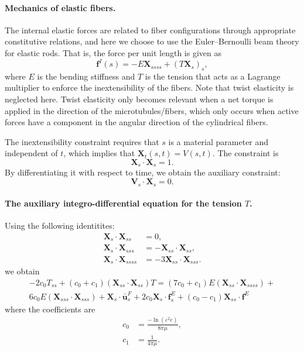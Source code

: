 \documentclass{article}
\newcommand{\XX}{\mathbf{X}}
\newcommand{\ubarF}{\bar{\mathbf{u}}^F}
\newcommand{\ff}{\mathbf{f}}
\newcommand{\VV}{\mathbf{V}}
\begin{document}
\paragraph{Mechanics of elastic fibers.}
The internal elastic forces are related to fiber configurations through appropriate constitutive relations, and here we choose to use the Euler–Bernoulli beam theory for elastic rods. That is, the force per unit length is given as
\begin{equation}
    \ff^I(s) = -E \XX_{ssss} + (T\XX_s)_s,
\end{equation}
where $E$ is the bending stiffness and $T$ is the tension that acts as a Lagrange multiplier to enforce the inextensibility of the fibers. Note that twist elasticity is neglected here. Twist elasticity only becomes relevant when a net torque is applied in the direction of the microtubules/fibers, which only occurs when active forces have a component in the angular direction of the cylindrical fibers.

The inextensibility constraint requires that $s$ is a material parameter and independent of $t$, which implies that $\XX_t(s,t) = V(s,t)$. The constraint is
\begin{equation}\label{eq:inextens}
    \XX_s \cdot \XX_s = 1.
\end{equation}
By differentiating it with respect to time, we obtain the auxiliary constraint:
\begin{equation}\label{eq:auxInextens}
    \VV_s \cdot \XX_s = 0.
\end{equation}
\paragraph*{The auxiliary integro-differential equation for the tension $T$.}
Using the following identitites:
\begin{align}
    \XX_s \cdot \XX_{ss} & = 0, \\
    \XX_s \cdot \XX_{sss} & = -\XX_{ss}\cdot \XX_{ss}, \\
    \XX_s \cdot \XX_{ssss} & = -3\XX_{ss} \cdot \XX_{sss}.
\end{align}
we obtain
\begin{multline}
    -2c_0T_{ss} + (c_0 + c_1)(\XX_{ss}\cdot\XX_{ss})T = (7c_0+c_1)E(\XX_{ss}\cdot\XX_{ssss}) + \\ 6c_0E(\XX_{sss}\cdot\XX_{sss}) + \XX_s \cdot \ubarF_s + 2c_0\XX_s\cdot \ff^E_s + (c_0 - c_1)\XX_{ss}\cdot \ff^E
\end{multline}
where the coefficients are
\begin{align}\label{eq:coeffs}
    c_0 &= \frac{-\ln(\varepsilon^2 e)}{8 \pi \mu}, \\
    c_1 &= \frac{1}{4\pi\mu}.
\end{align}
\end{document}
